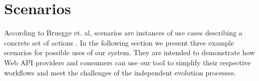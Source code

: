 \section{Scenarios}
\label{sec:Scenarios}
According to Bruegge et. al, scenarios are instances of use cases describing a concrete set of actions \cite{bruegge_object-oriented_2010}. In the following section we present three example scenarios for possible uses of our system. They are intended to demonstrate how Web API providers and consumers can use our tool to simplify their respective workflows and meet the challenges of the independent evolution processes.



